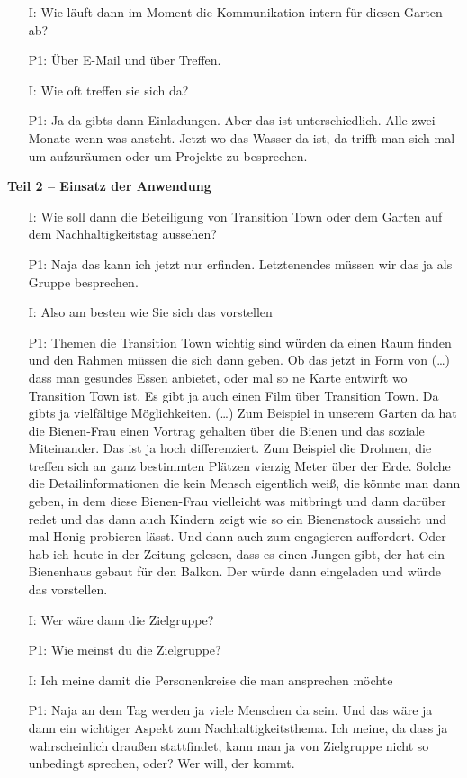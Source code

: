 \begin{itemize}
	\item[I:] Wie l{\"a}uft dann im Moment die Kommunikation intern f{\"u}r diesen Garten ab?
	\item[P1:] {\"U}ber E-Mail und {\"u}ber Treffen.
	\item[I:] Wie oft treffen sie sich da?
	\item[P1:] Ja da gibts dann Einladungen. Aber das ist unterschiedlich. Alle zwei Monate wenn was ansteht. Jetzt wo das Wasser da ist, da trifft man sich mal um aufzur{\"a}umen oder um Projekte zu besprechen.	
\end{itemize}

\textbf{Teil 2 -- Einsatz der Anwendung}
\begin{itemize}
	\item[I:] Wie soll dann die Beteiligung von Transition Town oder dem Garten auf dem Nachhaltigkeitstag aussehen?
	\item[P1:] Naja das kann ich jetzt nur erfinden. Letztenendes m{\"u}ssen wir das ja als Gruppe besprechen.
	\item[I:] Also am besten wie Sie sich das vorstellen
	\item[P1:] Themen die Transition Town wichtig sind w{\"u}rden da einen Raum finden und den Rahmen m{\"u}ssen die sich dann geben. Ob das jetzt in Form von (\dots) dass man gesundes Essen anbietet, oder mal so ne Karte entwirft wo Transition Town ist. Es gibt ja auch einen Film {\"u}ber Transition Town. Da gibts ja vielf{\"a}ltige M{\"o}glichkeiten. (\dots) Zum Beispiel in unserem Garten da hat die Bienen-Frau einen Vortrag gehalten {\"u}ber die Bienen und das soziale Miteinander. Das ist ja hoch differenziert. Zum Beispiel die Drohnen, die treffen sich an ganz bestimmten Pl{\"a}tzen vierzig Meter {\"u}ber der Erde. Solche die Detailinformationen die kein Mensch eigentlich wei{\ss}, die k{\"o}nnte man dann geben, in dem diese Bienen-Frau vielleicht was mitbringt und dann dar{\"u}ber redet und das dann auch Kindern zeigt wie so ein Bienenstock aussieht und mal Honig probieren l{\"a}sst. Und dann auch zum engagieren auffordert. Oder hab ich heute in der Zeitung gelesen, dass es einen Jungen gibt, der hat ein Bienenhaus gebaut f{\"u}r den Balkon. Der w{\"u}rde dann eingeladen und w{\"u}rde das vorstellen.
	\item[I:] Wer w{\"a}re dann die Zielgruppe? 
	\item[P1:] Wie meinst du die Zielgruppe?
	\item[I:] Ich meine damit die Personenkreise die man ansprechen m{\"o}chte
	\item[P1:] Naja an dem Tag werden ja viele Menschen da sein. Und das w{\"a}re ja dann ein wichtiger Aspekt zum Nachhaltigkeitsthema. Ich meine, da dass ja wahrscheinlich drau{\ss}en stattfindet, kann man ja von Zielgruppe nicht so unbedingt sprechen, oder? Wer will, der kommt.

\end{itemize}

